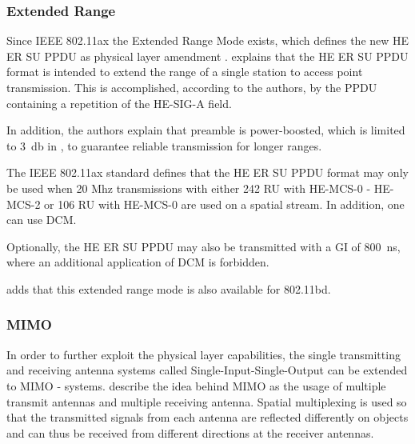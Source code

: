 \subsubsection*{Extended Range}
Since IEEE 802.11ax the Extended Range Mode exists, which defines the new HE ER SU \ac{PPDU} as physical layer amendment \cite{standard_ieee_2021} \cite{afaqui_ieee_2017}. 
\textcite{deng_ieee_2017} explains that the HE ER SU \ac{PPDU} format is intended to extend the range of a single station to access point transmission. This is accomplished, according to the authors, by the PPDU containing a repetition of the HE-SIG-A field.

In addition, the authors explain that preamble is power-boosted, which is limited to \SI{3}{\decibel} in \cite{standard_ieee_2021} \cite{jacob_system-level_2020}, to guarantee reliable transmission for longer ranges. 

The IEEE 802.11ax \cite{standard_ieee_2021} standard defines that the HE ER SU \ac{PPDU} format may only be used when 20 Mhz transmissions with either 242 RU with HE-MCS-0 - HE-MCS-2 or 106 RU with HE-MCS-0 are used on a spatial stream. In addition, one can use \ac{DCM}.

Optionally, the HE ER SU \ac{PPDU} may also be transmitted with a \ac{GI} of \SI{800}{\nano\second}, where an additional application of \ac{DCM} is forbidden. 
	
\textcite{jacob_system-level_2020} adds that this extended range mode is also available for 802.11bd.






\subsubsection*{\ac{MIMO}}
In order to further exploit the physical layer capabilities, the single transmitting and receiving antenna systems called Single-Input-Single-Output can be extended to \ac{MIMO} - systems.
\textcite{sauter_wireless_2022} describe the idea behind \ac{MIMO} as the usage of multiple transmit antennas and multiple receiving antenna. Spatial multiplexing is used so that the transmitted signals from each antenna are reflected differently on objects and can thus be received from different directions at the receiver antennas. 


